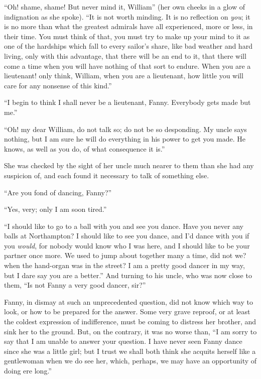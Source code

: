 \documentclass{article}
\begin{document}
``Oh! shame, shame!  But never mind it, William'' (her own
cheeks in a glow of indignation as she spoke). ``It is not
worth minding.  It is no reflection on \emph{you}; it is no
more than what the greatest admirals have all experienced,
more or less, in their time.  You must think of that,
you must try to make up your mind to it as one of the
hardships which fall to every sailor's share, like bad
weather and hard living, only with this advantage,
that there will be an end to it, that there will come
a time when you will have nothing of that sort to endure.
When you are a lieutenant! only think, William, when you
are a lieutenant, how little you will care for any nonsense
of this kind.''

``I begin to think I shall never be a lieutenant, Fanny.
Everybody gets made but me.''

``Oh! my dear William, do not talk so; do not be so desponding.
My uncle says nothing, but I am sure he will do everything
in his power to get you made.  He knows, as well as you do,
of what consequence it is.''

She was checked by the sight of her uncle much nearer
to them than she had any suspicion of, and each found
it necessary to talk of something else.

``Are you fond of dancing, Fanny?''

``Yes, very; only I am soon tired.''

``I should like to go to a ball with you and see
you dance.  Have you never any balls at Northampton?
I should like to see you dance, and I'd dance with you
if you \emph{would}, for nobody would know who I was here,
and I should like to be your partner once more.
We used to jump about together many a time, did not we?
when the hand-organ was in the street?  I am a pretty
good dancer in my way, but I dare say you are a better.''
And turning to his uncle, who was now close to them,
``Is not Fanny a very good dancer, sir?''

Fanny, in dismay at such an unprecedented question,
did not know which way to look, or how to be prepared
for the answer.  Some very grave reproof, or at least
the coldest expression of indifference, must be coming
to distress her brother, and sink her to the ground.
But, on the contrary, it was no worse than, ``I am sorry
to say that I am unable to answer your question.
I have never seen Fanny dance since she was a little girl;
but I trust we shall both think she acquits herself like
a gentlewoman when we do see her, which, perhaps, we may
have an opportunity of doing ere long.''
\end{document}
